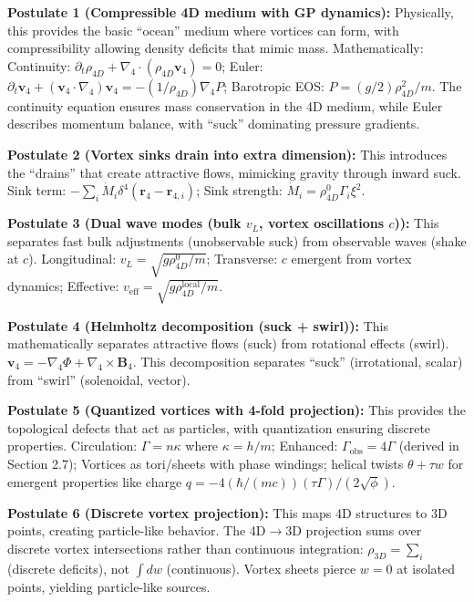 \begin{tcolorbox}
\textbf{Postulate 1 (Compressible 4D medium with GP dynamics):} Physically, this provides the basic ``ocean'' medium where vortices can form, with compressibility allowing density deficits that mimic mass. Mathematically: Continuity: $\partial_t \rho_{4D} + \nabla_4 \cdot (\rho_{4D} \mathbf{v}_4) = 0$; Euler: $\partial_t \mathbf{v}_4 + (\mathbf{v}_4 \cdot \nabla_4) \mathbf{v}_4 = -(1/\rho_{4D}) \nabla_4 P$; Barotropic EOS: $P = (g/2) \rho_{4D}^2 / m$. The continuity equation ensures mass conservation in the 4D medium, while Euler describes momentum balance, with ``suck'' dominating pressure gradients.

\textbf{Postulate 2 (Vortex sinks drain into extra dimension):} This introduces the ``drains'' that create attractive flows, mimicking gravity through inward suck. Sink term: $-\sum_i \dot{M}_i \delta^4(\mathbf{r}_4 - \mathbf{r}_{4,i})$; Sink strength: $\dot{M}_i = \rho_{4D}^0 \Gamma_i \xi^2$.

\textbf{Postulate 3 (Dual wave modes (bulk $v_L$, vortex oscillations $c$)):} This separates fast bulk adjustments (unobservable suck) from observable waves (shake at $c$). Longitudinal: $v_L = \sqrt{g \rho_{4D}^0 / m}$; Transverse: $c$ emergent from vortex dynamics; Effective: $v_{\text{eff}} = \sqrt{g \rho_{4D}^{\text{local}} / m}$.

\textbf{Postulate 4 (Helmholtz decomposition (suck + swirl)):} This mathematically separates attractive flows (suck) from rotational effects (swirl). $\mathbf{v}_4 = -\nabla_4 \Phi + \nabla_4 \times \mathbf{B}_4$. This decomposition separates ``suck'' (irrotational, scalar) from ``swirl'' (solenoidal, vector).

\textbf{Postulate 5 (Quantized vortices with 4-fold projection):} This provides the topological defects that act as particles, with quantization ensuring discrete properties. Circulation: $\Gamma = n \kappa$ where $\kappa = h / m$; Enhanced: $\Gamma_{\text{obs}} = 4 \Gamma$ (derived in Section 2.7); Vortices as tori/sheets with phase windings; helical twists $\theta + \tau w$ for emergent properties like charge $q = -4 (\hbar / (m c)) (\tau \Gamma) / (2 \sqrt{\phi})$.

\textbf{Postulate 6 (Discrete vortex projection):} This maps 4D structures to 3D points, creating particle-like behavior. The 4D$\to$3D projection sums over discrete vortex intersections rather than continuous integration: $\rho_{3D} = \sum_i$ (discrete deficits), not $\int dw$ (continuous). Vortex sheets pierce $w=0$ at isolated points, yielding particle-like sources.
\end{tcolorbox}


